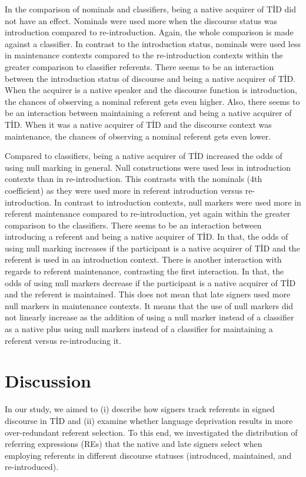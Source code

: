 \documentclass[]{elsarticle} %
\begin{document}
In the comparison of nominals and classifiers, being a native acquirer
of TİD did not have an effect. Nominals were used more when the
discourse status was introduction compared to re-introduction. Again,
the whole comparison is made against a classifier. In contrast to the
introduction status, nominals were used less in maintenance contexts
compared to the re-introduction contexts within the greater comparison
to classifier referents. There seems to be an interaction between the
introduction status of discourse and being a native acquirer of TİD.
When the acquirer is a native speaker and the discourse function is
introduction, the chances of observing a nominal referent gets even
higher. Also, there seems to be an interaction between maintaining a
referent and being a native acquirer of TİD. When it was a native
acquirer of TİD and the discourse context was maintenance, the chances
of observing a nominal referent gets even lower.

Compared to classifiers, being a native acquirer of TİD increased the
odds of using null marking in general. Null constructions were used less
in introduction contexts than in re-introduction. This contrasts with
the nominals (4th coefficient) as they were used more in referent
introduction versus re-introduction. In contrast to introduction
contexts, null markers were used more in referent maintenance compared
to re-introduction, yet again within the greater comparison to the
classifiers. There seems to be an interaction between introducing a
referent and being a native acquirer of TİD. In that, the odds of using
null marking increases if the participant is a native acquirer of TİD
and the referent is used in an introduction context. There is another
interaction with regards to referent maintenance, contrasting the first
interaction. In that, the odds of using null markers decrease if the
participant is a native acquirer of TİD and the referent is maintained.
This does not mean that late signers used more null markers in
maintenance contexts. It means that the use of null markers did not
linearly increase as the addition of using a null marker instead of a
classifier as a native plus using null markers instead of a classifier
for maintaining a referent versus re-introducing it.

\hypertarget{discussion}{%
\section{Discussion}\label{discussion}}

In our study, we aimed to (i) describe how signers track referents in
signed discourse in TİD and (ii) examine whether language deprivation
results in more over-redundant referent selection. To this end, we
investigated the distribution of referring expressions (REs) that the
native and late signers select when employing referents in different
discourse statuses (introduced, maintained, and re-introduced).
\end{document}
